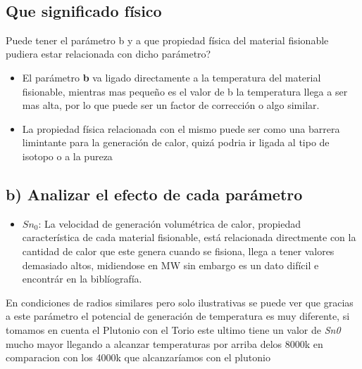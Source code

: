 \documentclass[11pt]{article}
\providecommand{\tightlist}{%
      \setlength{\itemsep}{0pt}\setlength{\parskip}{0pt}}
\begin{document}
    \begin{center}
    \end{center}
    { \hspace*{\fill} \\}
    
    \hypertarget{que-significado-fuxedsico}{%
\subsection{Que significado físico}\label{que-significado-fuxedsico}}

Puede tener el parámetro b y a que propiedad física del material
fisionable pudiera estar relacionada con dicho parámetro?

\begin{itemize}
\item
  El parámetro \textbf{b} va ligado directamente a la temperatura del
  material fisionable, mientras mas pequeño es el valor de b la
  temperatura llega a ser mas alta, por lo que puede ser un factor de
  corrección o algo similar.
\item
  La propiedad física relacionada con el mismo puede ser como una
  barrera limintante para la generación de calor, quizá podria ir ligada
  al tipo de isotopo o a la pureza
\end{itemize}

    \hypertarget{b-analizar-el-efecto-de-cada-paruxe1metro}{%
\subsection{\texorpdfstring{\textbf{b)} Analizar el efecto de cada
parámetro}{b) Analizar el efecto de cada parámetro}}\label{b-analizar-el-efecto-de-cada-paruxe1metro}}

\begin{itemize}
\tightlist
\item
  \(Sn_0\): La velocidad de generación volumétrica de calor, propiedad
  característica de cada material fisionable, está relacionada
  directmente con la cantidad de calor que este genera cuando se
  fisiona, llega a tener valores demasiado altos, midiendose en MW sin
  embargo es un dato difícil e encontrár en la biblíografía.
\end{itemize}

En condiciones de radios similares pero solo ilustrativas se puede ver
que gracias a este parámetro el potencial de generación de temperatura
es muy diferente, si tomamos en cuenta el Plutonio con el Torio este
ultimo tiene un valor de \emph{Sn0} mucho mayor llegando a alcanzar
temperaturas por arriba delos 8000k en comparacion con los 4000k que
alcanzaríamos con el plutonio
\end{document}
